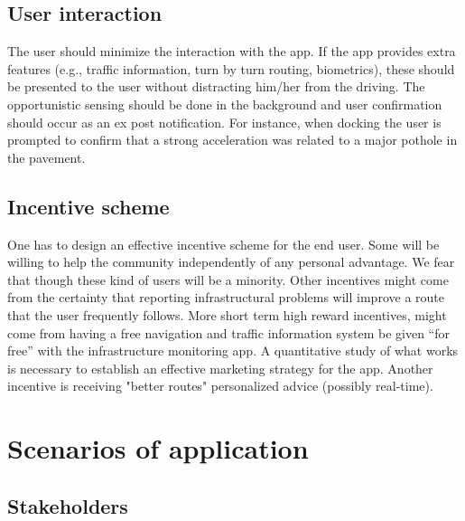 \documentclass[preprint,12pt]{elsarticle}
\theoremstyle{definition}
\begin{document}
\subsection{User interaction}

The user should minimize the interaction with the app. If the app
provides extra features (e.g., traffic information, turn by turn
routing, biometrics), these should be presented to the user without
distracting him/her from the driving. The opportunistic sensing should
be done in the background and user confirmation should occur as an ex
post notification. For instance, when docking the user is prompted to
confirm that a strong acceleration was related to a major pothole in
the pavement. 


\subsection{Incentive scheme}

One has to design an effective incentive scheme for the end user. Some
will be willing to help the community independently of any personal
advantage. We fear that though these kind of users will be a
minority. Other incentives might come from the certainty that
reporting infrastructural problems will improve a route that the user
frequently follows. More short term high reward incentives, might come
from having a free navigation and traffic information system be given
``for free'' with the infrastructure monitoring app. A quantitative
study of what works is necessary to establish an effective marketing
strategy for the app. Another incentive is receiving "better routes" 
personalized advice (possibly real-time). 


\section{Scenarios of application}

\subsection{Stakeholders}
\end{document}
